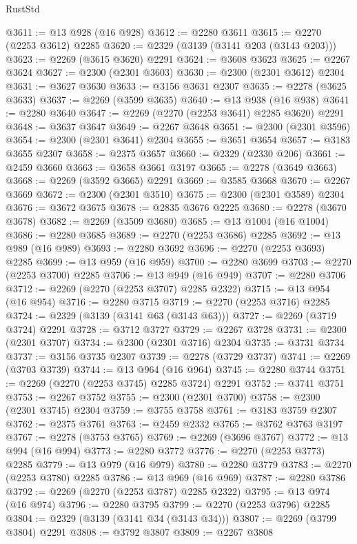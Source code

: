 \begin{lexlean}{RustStd}
\begin{coremodule}
{\begin{coremodule}
{{{{{{{{{{{{@3611 := @13 @928 (@16 @928)
@3612 := @2280 @3611
@3615 := @2270 (@2253 @3612) @2285
@3620 := @2329 (@3139 (@3141 @203 (@3143 @203)))
@3623 := @2269 (@3615 @3620) @2291
@3624 := @3608 @3623
@3625 := @2267 @3624
@3627 := @2300 (@2301 @3603)
@3630 := @2300 (@2301 @3612) @2304
@3631 := @3627 @3630
@3633 := @3156 @3631 @2307
@3635 := @2278 (@3625 @3633)
@3637 := @2269 (@3599 @3635)
@3640 := @13 @938 (@16 @938)
@3641 := @2280 @3640
@3647 := @2269 (@2270 (@2253 @3641) @2285 @3620) @2291
@3648 := @3637 @3647
@3649 := @2267 @3648
@3651 := @2300 (@2301 @3596)
@3654 := @2300 (@2301 @3641) @2304
@3655 := @3651 @3654
@3657 := @3183 @3655 @2307
@3658 := @2375 @3657
@3660 := @2329 (@2330 @206)
@3661 := @2459 @3660
@3663 := @3658 @3661 @3197
@3665 := @2278 (@3649 @3663)
@3668 := @2269 (@3592 @3665) @2291
@3669 := @3585 @3668
@3670 := @2267 @3669
@3672 := @2300 (@2301 @3510)
@3675 := @2300 (@2301 @3589) @2304
@3676 := @3672 @3675
@3678 := @2835 @3676 @2225
@3680 := @2278 (@3670 @3678)
@3682 := @2269 (@3509 @3680)
@3685 := @13 @1004 (@16 @1004)
@3686 := @2280 @3685
@3689 := @2270 (@2253 @3686) @2285
@3692 := @13 @989 (@16 @989)
@3693 := @2280 @3692
@3696 := @2270 (@2253 @3693) @2285
@3699 := @13 @959 (@16 @959)
@3700 := @2280 @3699
@3703 := @2270 (@2253 @3700) @2285
@3706 := @13 @949 (@16 @949)
@3707 := @2280 @3706
@3712 := @2269 (@2270 (@2253 @3707) @2285 @2322)
@3715 := @13 @954 (@16 @954)
@3716 := @2280 @3715
@3719 := @2270 (@2253 @3716) @2285
@3724 := @2329 (@3139 (@3141 @63 (@3143 @63)))
@3727 := @2269 (@3719 @3724) @2291
@3728 := @3712 @3727
@3729 := @2267 @3728
@3731 := @2300 (@2301 @3707)
@3734 := @2300 (@2301 @3716) @2304
@3735 := @3731 @3734
@3737 := @3156 @3735 @2307
@3739 := @2278 (@3729 @3737)
@3741 := @2269 (@3703 @3739)
@3744 := @13 @964 (@16 @964)
@3745 := @2280 @3744
@3751 := @2269 (@2270 (@2253 @3745) @2285 @3724) @2291
@3752 := @3741 @3751
@3753 := @2267 @3752
@3755 := @2300 (@2301 @3700)
@3758 := @2300 (@2301 @3745) @2304
@3759 := @3755 @3758
@3761 := @3183 @3759 @2307
@3762 := @2375 @3761
@3763 := @2459 @2332
@3765 := @3762 @3763 @3197
@3767 := @2278 (@3753 @3765)
@3769 := @2269 (@3696 @3767)
@3772 := @13 @994 (@16 @994)
@3773 := @2280 @3772
@3776 := @2270 (@2253 @3773) @2285
@3779 := @13 @979 (@16 @979)
@3780 := @2280 @3779
@3783 := @2270 (@2253 @3780) @2285
@3786 := @13 @969 (@16 @969)
@3787 := @2280 @3786
@3792 := @2269 (@2270 (@2253 @3787) @2285 @2322)
@3795 := @13 @974 (@16 @974)
@3796 := @2280 @3795
@3799 := @2270 (@2253 @3796) @2285
@3804 := @2329 (@3139 (@3141 @34 (@3143 @34)))
@3807 := @2269 (@3799 @3804) @2291
@3808 := @3792 @3807
@3809 := @2267 @3808
}}}}}}}}}}}}
\end{coremodule}}
\end{coremodule}
\end{lexlean}
